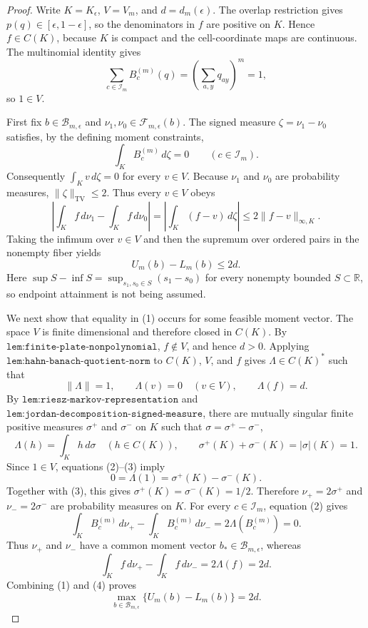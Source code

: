 \documentclass{article}
\begin{document}
\begin{proof}
Write \(K=K_{\epsilon}\), \(V=V_m\), and \(d=d_m(\epsilon)\).  The overlap restriction gives \(p(q)\in[\epsilon,1-\epsilon]\), so the denominators in \(f\) are positive on \(K\).  Hence \(f\in C(K)\), because \(K\) is compact and the cell-coordinate maps are continuous.  The multinomial identity gives
\[
 \sum_{c\in\mathcal I_m}B_c^{(m)}(q)
 =\left(\sum_{a,y}q_{ay}\right)^m=1,
\]
so \(1\in V\).

First fix \(b\in\mathcal B_{m,\epsilon}\) and \(\nu_1,\nu_0\in\mathcal F_{m,\epsilon}(b)\).  The signed measure \(\zeta=\nu_1-\nu_0\) satisfies, by the defining moment constraints,
\[
 \int_K B_c^{(m)}\,d\zeta=0
 \qquad(c\in\mathcal I_m).
\]
Consequently \(\int_Kv\,d\zeta=0\) for every \(v\in V\).  Because \(\nu_1\) and \(\nu_0\) are probability measures, \(\lVert\zeta\rVert_{\mathrm{TV}}\leq2\).  Thus every \(v\in V\) obeys
\[
 \left|\int_K f\,d\nu_1-\int_K f\,d\nu_0\right|
 =\left|\int_K(f-v)\,d\zeta\right|
 \leq2\lVert f-v\rVert_{\infty,K}.
\]
Taking the infimum over \(v\in V\) and then the supremum over ordered pairs in the nonempty fiber yields
\[
 U_m(b)-L_m(b)\leq2d. \tag{1}
\]
Here \(\sup S-\inf S=\sup_{s_1,s_0\in S}(s_1-s_0)\) for every nonempty bounded \(S\subset\mathbb R\), so endpoint attainment is not being assumed.

We next show that equality in (1) occurs for some feasible moment vector.  The space \(V\) is finite dimensional and therefore closed in \(C(K)\).  By \(\texttt{lem:finite-plate-nonpolynomial}\), \(f\notin V\), and hence \(d>0\).  Applying \(\texttt{lem:hahn-banach-quotient-norm}\) to \(C(K)\), \(V\), and \(f\) gives \(\Lambda\in C(K)^*\) such that
\[
 \lVert\Lambda\rVert=1,
 \qquad \Lambda(v)=0\quad(v\in V),
 \qquad \Lambda(f)=d. \tag{2}
\]
By \(\texttt{lem:riesz-markov-representation}\) and \(\texttt{lem:jordan-decomposition-signed-measure}\), there are mutually singular finite positive measures \(\sigma^+\) and \(\sigma^-\) on \(K\) such that \(\sigma=\sigma^+-\sigma^-\),
\[
 \Lambda(h)=\int_Kh\,d\sigma
 \quad(h\in C(K)),
 \qquad
 \sigma^+(K)+\sigma^-(K)=|\sigma|(K)=1. \tag{3}
\]
Since \(1\in V\), equations (2)--(3) imply
\[
 0=\Lambda(1)=\sigma^+(K)-\sigma^-(K).
\]
Together with (3), this gives \(\sigma^+(K)=\sigma^-(K)=1/2\).  Therefore \(\nu_+=2\sigma^+\) and \(\nu_-=2\sigma^-\) are probability measures on \(K\).  For every \(c\in\mathcal I_m\), equation (2) gives
\[
 \int_KB_c^{(m)}\,d\nu_+
 -\int_KB_c^{(m)}\,d\nu_-
 =2\Lambda(B_c^{(m)})=0.
\]
Thus \(\nu_+\) and \(\nu_-\) have a common moment vector \(b_*\in\mathcal B_{m,\epsilon}\), whereas
\[
 \int_Kf\,d\nu_+-\int_Kf\,d\nu_-
 =2\Lambda(f)=2d. \tag{4}
\]
Combining (1) and (4) proves
\[
 \max_{b\in\mathcal B_{m,\epsilon}}
 \{U_m(b)-L_m(b)\}=2d. \tag{5}
\]


\end{proof}
\end{document}
